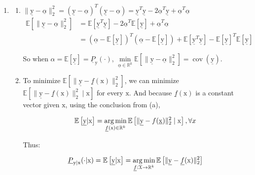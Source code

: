 \documentclass[a4paper]{article}
\begin{document}
\begin{enumerate}
\item \begin{enumerate}
  \item $\|\underline{\mathrm{y}} - \underline{\alpha}\|_2^2 = (\underline{\mathrm{y}} - \underline{\alpha})^T (\underline{\mathrm{y}} - \underline{\alpha}) = \underline{\mathrm{y}}^T\underline{\mathrm{y}} - 2\underline{\alpha}^T \underline{\mathrm{y}}+ \underline{\alpha}^T \underline{\alpha}$
  \begin{equation}
    \begin{aligned}
      \mathbb{E}\left[\|\underline{\mathrm{y}} - \underline{\alpha}\|_2^2\right] & = \mathbb{E}\left[\underline{\mathrm{y}}^T\underline{\mathrm{y}}\right] - 2\underline{\alpha}^T \mathbb{E}[\underline{\mathrm{y}}]+ \underline{\alpha}^T \underline{\alpha} \\
      & = (\underline{\alpha} -\mathbb{E}[\underline{\mathrm{y}}])^T(\underline{\alpha} -\mathbb{E}[\underline{\mathrm{y}}]) + \mathbb{E}\left[\underline{\mathrm{y}}^T\underline{\mathrm{y}}\right] - \mathbb{E}[\underline{\mathrm{y}}]^T \mathbb{E}[\underline{\mathrm{y}}]
    \end{aligned}
  \end{equation}

  So when $\alpha = \mathbb{E}[\underline{\mathrm{y}}] = \underline{P}_{\mathrm{y}}(\cdot)$, $ \min\limits_{\underline{\alpha}\in \mathbb{R}^k } \mathbb{E}\left[\|\underline{\mathrm{y}} - \underline{\alpha}\|_2^2\right] = \operatorname{cov}(\underline{\mathrm{y}})$.

  \item To minimize $\mathbb{E}\left[\|\underline{\mathrm{y}} - \underline{f}(\mathrm{x})\|_2^2\right]$, we can minimize $\mathbb{E}\left[\|\underline{\mathrm{y}} - \underline{f}(\mathrm{x})\|_2^2 \mid \mathrm{x}\right]$ for every ${\mathrm{x}}$. And because $\underline{f}(\mathrm{x})$ is a constant vector given ${\mathrm{x}}$, using the conclusion from (a), 
  
  \begin{equation}
    \mathbb{E}\left[\underline{\mathrm{y}} | {\mathrm{x}}\right] = \operatorname*{arg\,min}_{\underline{f}(\mathrm{x}) \in  \mathbb{R}^k} \mathbb{E}\left[\|\underline{\mathrm{y}} - f(\underline{\mathrm{x}})\|_2^2 \mid \mathrm{x}\right], \forall x 
  \end{equation}

  Thus:

  \begin{equation}
    \underline{P}_{\mathrm{y} | \mathrm{x}} (\cdot | \mathrm{x}) = \mathbb{E}\left[\underline{\mathrm{y}} | {\mathrm{x}}\right] = \operatorname*{arg\,min}_{\underline{f}:\mathcal{X} \to \mathbb{R}^k} \mathbb{E}\left[\|\underline{\mathrm{y}} - \underline{f}(\mathrm{x})\|_2^2 \right]
  \end{equation}
\end{enumerate}


\end{enumerate}
\end{document}
